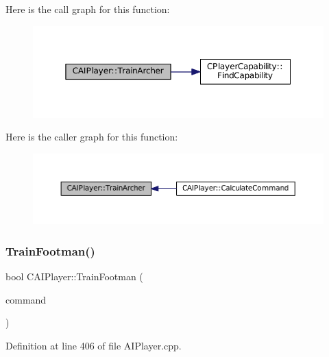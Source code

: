 Here is the call graph for this function\+:
\nopagebreak
\begin{figure}[H]
\begin{center}
\leavevmode
\includegraphics[width=350pt]{classCAIPlayer_af2edf1e3c54d6af693f768f86d484fd6_cgraph}
\end{center}
\end{figure}
Here is the caller graph for this function\+:
\nopagebreak
\begin{figure}[H]
\begin{center}
\leavevmode
\includegraphics[width=350pt]{classCAIPlayer_af2edf1e3c54d6af693f768f86d484fd6_icgraph}
\end{center}
\end{figure}
\hypertarget{classCAIPlayer_aa3f9c1d0d449a45a24e065d2086527b0}{}\label{classCAIPlayer_aa3f9c1d0d449a45a24e065d2086527b0} 
\subsubsection{\texorpdfstring{Train\+Footman()}{TrainFootman()}}
{\footnotesize\ttfamily bool C\+A\+I\+Player\+::\+Train\+Footman (\begin{DoxyParamCaption}\item[{\hyperlink{structSPlayerCommandRequest}{S\+Player\+Command\+Request} \&}]{command }\end{DoxyParamCaption})\hspace{0.3cm}{\ttfamily [protected]}}



Definition at line 406 of file A\+I\+Player.\+cpp.


